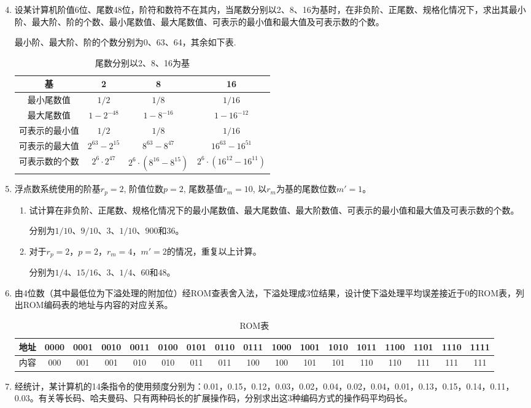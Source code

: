 \documentclass[a4paper,punct=CCT]{ctexbook}
\begin{document}
\begin{enumerate}
  \setcounter{enumi}{3}
\item 设某计算机阶值6位、尾数48位，阶符和数符不在其内，当尾数分别以2、8、16为基时，在非负阶、正尾数、规格化情况下，求出其最小阶、最大阶、阶的个数、最小尾数值、最大尾数值、可表示的最小值和最大值及可表示数的个数。

  最小阶、最大阶、阶的个数分别为0、63、64，其余如下表.

  \begin{table}[h]
    \centering
    \begin{tabular}{c|c|c|c}
      基 & 2 & 8 & 16 \\
      \hline
      最小尾数值 & \(1/2\) & \(1/8\) & \(1/16\) \\
      \hline
      最大尾数值 & \(1 - 2^{-48}\) & \(1- 8^{-16}\) & \(1 - 16^{-12}\) \\
      \hline
      可表示的最小值 & \(1/2\) & \(1/8\) & \(1/16\) \\
      \hline
      可表示的最大值 & \(2^{63} - 2^{15}\) & \(8^{63} - 8^{47}\) & \(16^{63} - 16^{51}\) \\
      \hline
      可表示数的个数 & \(2^6 \cdot 2^{47}\) & \(2^6 \cdot (8^{16} - 8^{15})\) & \(2^6 \cdot (16^{12} - 16^{11})\)
    \end{tabular}
    \caption{尾数分别以2、8、16为基}
  \end{table}

\item 浮点数系统使用的阶基\(r_p = 2\), 阶值位数\(p = 2\), 尾数基值\(r_m = 10\), 以\(r_m\)为基的尾数位数\(m' = 1\)。
  \begin{enumerate}
  \item 试计算在非负阶、正尾数、规格化情况下的最小尾数值、最大尾数值、最大阶数值、可表示的最小值和最大值及可表示数的个数。

    分别为\(1/10\)、\(9/10\)、\(3\)、\(1/10\)、\(900\)和\(36\)。

  \item 对于\(r_p = 2\)，\(p = 2\)，\(r_m = 4\)，\(m' = 2\)的情况，重复以上计算。

    分别为\(1/4\)、\(15/16\)、\(3\)、\(1/4\)、\(60\)和\(48\)。
  \end{enumerate}
  
\item 由4位数（其中最低位为下溢处理的附加位）经ROM查表舍入法，下溢处理成3位结果，设计使下溢处理平均误差接近于0的ROM表，列出ROM编码表的地址与内容的对应关系。

  \begin{table}[h]
    \centering
    \small
    \begin{tabular}{c|c|c|c|c|c|c|c|c|c|c|c|c|c|c|c|c}
      地址 & 0000 & 0001 & 0010 & 0011 & 0100 & 0101 & 0110 & 0111 & 1000 & 1001 & 1010 & 1011 & 1100 & 1101 & 1110 & 1111 \\
      \hline
      内容 & 000 & 001 & 001 & 010 & 010 & 011 & 011 & 100 & 100 & 101 & 101 & 110 & 110 & 111 & 111 & 111
    \end{tabular}
    \caption{ROM表}
  \end{table}
  
  \setcounter{enumi}{8}
\item 经统计，某计算机的14条指令的使用频度分别为：0.01，0.15，0.12，0.03，0.02，0.04，0.02，0.04，0.01，0.13，0.15，0.14，0.11，0.03。有关等长码、哈夫曼码、只有两种码长的扩展操作码，分别求出这3种编码方式的操作码平均码长。
\end{enumerate}
\end{document}
